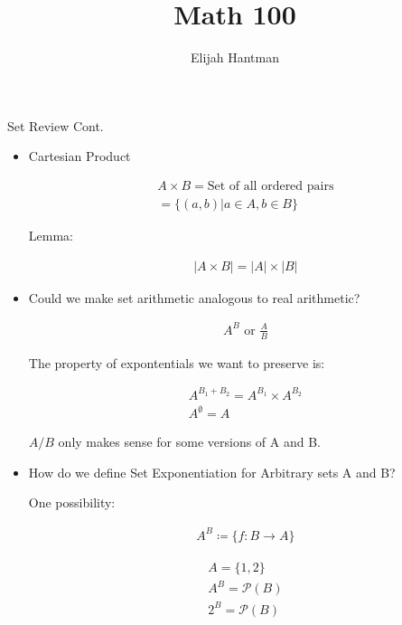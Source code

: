 \documentclass{report}
\title{\Huge{Math 100}}
\author{\huge{Elijah Hantman}}
\date{}
\begin{document}
\maketitle
\newpage

Set Review Cont.
\begin{itemize}
    \item Cartesian Product

        \begin{gather}
            A \times B = \text{Set of all ordered pairs}\\
            = \{(a,b) | a \in A, b \in B \}
        \end{gather}

        Lemma:
        \begin{mdframed}
            \begin{gather}
                |A \times B| = |A| \times |B| 
            \end{gather}
        \end{mdframed}

    \item Could we make set arithmetic analogous to real arithmetic?

        \begin{gather}
            A^B \text{ or } \frac{A}{B} 
        \end{gather}

        The property of expontentials we want to preserve
        is:

        \begin{gather}
            A^{B_1 + B_2} = A^{B_1} \times A^{B_2}\\
            A^{\emptyset} = A
        \end{gather}

        $A/B$ only makes sense for some versions of A and B.


    \item How do we define Set Exponentiation for Arbitrary sets A and B?
        
        One possibility:

        \begin{mdframed}
            \begin{gather}
                A^B \coloneq \{f: B \to A \} 
            \end{gather}

            \begin{gather}
                A = \{1, 2\}\\
                A^B = \mathcal{P}(B)\\
                2^B = \mathcal{P}(B)
            \end{gather}


\end{mdframed}
\end{itemize}
\end{document}
